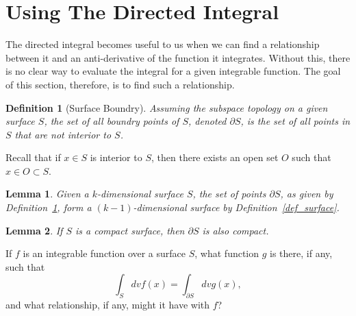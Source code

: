 \documentclass[12pt]{article}
\numberwithin{equation}{section}
\newtheorem{definition}{Definition}[section]
\newtheorem{lemma}{Lemma}[section]
\begin{document}

\section{Using The Directed Integral}

The directed integral becomes useful to us when we can find a relationship between it
and an anti-derivative of the function it integrates.  Without this, there is no clear way
to evaluate the integral for a given integrable function.  The goal of this section, therefore,
is to find such a relationship.

\begin{definition}[Surface Boundry]\label{def_surface_boundry}
Assuming the subspace topology on a given surface $S$, the set of
all boundry points of $S$, denoted $\partial S$, is the set of all points
in $S$ that are not interior to $S$.
\end{definition}

Recall that if $x\in S$ is interior to $S$, then there exists an open
set $O$ such that $x\in O\subset S$.

\begin{lemma}
Given a $k$-dimensional surface $S$, the set of points $\partial S$, as given by
Definition~\ref{def_surface_boundry}, form a $(k-1)$-dimensional surface by
Definition~\ref{def_surface}.
\end{lemma}

\begin{lemma}
If $S$ is a compact surface, then $\partial S$ is also compact.
\end{lemma}


If $f$ is an integrable function over a surface $S$, what function $g$ is there, if any, such that
\begin{equation*}
\int_S dv f(x) = \int_{\partial S} dv g(x),
\end{equation*}
and what relationship, if any, might it have with $f$?
\end{document}
